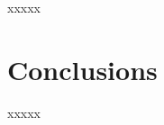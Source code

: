\documentclass{aa}
\begin{document}
 xxxxx





\section{Conclusions}
 \label{sec:conclusions}

 xxxxx









\end{document}
